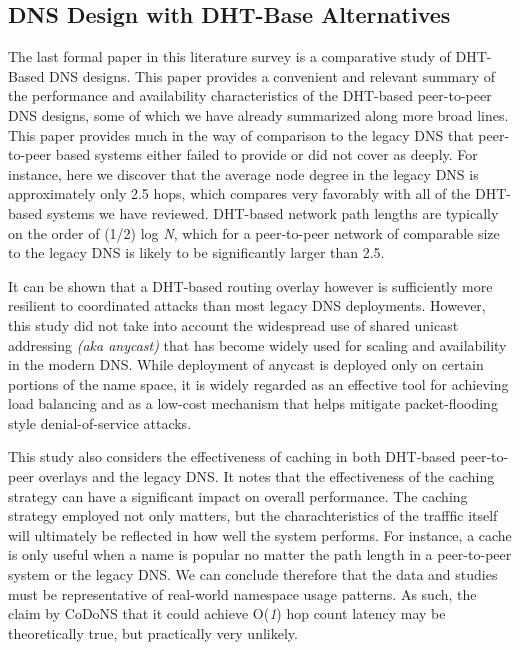 \documentclass[sigconf]{acmart}
\begin{document}
\subsection{DNS Design with DHT-Base Alternatives}

The last formal paper in this literature survey is a comparative study
of DHT-Based DNS designs.\cite{pappas_comparative_2006}  This paper
provides a convenient and relevant summary of the performance and
availability characteristics of the DHT-based peer-to-peer DNS designs,
some of which we have already summarized along more broad lines.  This
paper provides much in the way of comparison to the legacy DNS that
peer-to-peer based systems either failed to provide or did not cover as
deeply.  For instance, here we discover that the average node degree in
the legacy DNS is approximately only 2.5 hops, which compares very
favorably with all of the DHT-based systems we have reviewed.  DHT-based
network path lengths are typically on the order of (1/2) log \emph{N},
which for a peer-to-peer network of comparable size to the legacy DNS is
likely to be significantly larger than 2.5.

It can be shown that a DHT-based routing overlay however is sufficiently
more resilient to coordinated attacks than most legacy DNS deployments.
However, this study did not take into account the widespread use of
shared unicast addressing \emph{(aka anycast)} that has become widely
used for scaling and availability in the modern
DNS.\cite{hardie_distributing_2002}  While deployment of anycast is
deployed only on certain portions of the name space, it is widely
regarded as an effective tool for achieving load balancing and as a
low-cost mechanism that helps mitigate packet-flooding style
denial-of-service attacks.

This study also considers the effectiveness of caching in both DHT-based
peer-to-peer overlays and the legacy DNS.  It notes that the
effectiveness of the caching strategy can have a significant impact on
overall performance.  The caching strategy employed not only matters,
but the charachteristics of the trafffic itself will ultimately be
reflected in how well the system performs.  For instance, a cache is
only useful when a name is popular no matter the path length in a
peer-to-peer system or the legacy DNS.  We can conclude therefore that
the data and studies must be representative of real-world namespace
usage patterns.  As such, the claim by CoDoNS that it could achieve
O(\emph{1}) hop count latency may be theoretically true, but
practically very unlikely.
\end{document}
